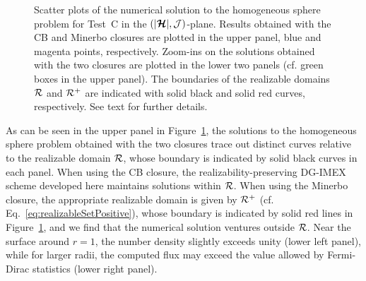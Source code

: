 \begin{figure}[H]
\begin{tabular}{cc}
  \end{tabular}
   \caption{Scatter plots of the numerical solution to the homogeneous sphere problem for Test~C in the $(|\boldsymbol{\mathcal{H}}|,\mathcal{J})$-plane.  Results obtained with the CB and Minerbo closures are plotted in the upper panel, blue and magenta points, respectively.  Zoom-ins on the solutions obtained with the two closures are plotted in the lower two panels (cf. green boxes in the upper panel).  The boundaries of the realizable domains $\mathcal{R}$ and $\mathcal{R}^{+}$ are indicated with solid black and solid red curves, respectively.  See text for further details.  }
  \label{fig:HomogeneousSphereRealizability}
\end{figure}
As can be seen in the upper panel in Figure~\ref{fig:HomogeneousSphereRealizability}, the solutions to the homogeneous sphere problem obtained with the two closures trace out distinct curves relative to the realizable domain $\mathcal{R}$, whose boundary is indicated by solid black curves in each panel.  
When using the CB closure, the realizability-preserving DG-IMEX scheme developed here maintains solutions within $\mathcal{R}$.  
When using the Minerbo closure, the appropriate realizable domain is given by $\mathcal{R}^{+}$ (cf. Eq.~\eqref{eq:realizableSetPositive}), whose boundary is indicated by solid red lines in Figure~\ref{fig:HomogeneousSphereRealizability}, and we find that the numerical solution ventures outside $\mathcal{R}$.  
Near the surface around $r=1$, the number density slightly exceeds unity (lower left panel), while for larger radii, the computed flux may exceed the value allowed by Fermi-Dirac statistics (lower right panel).  